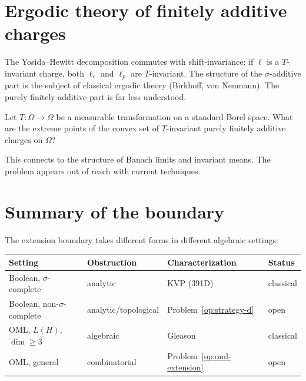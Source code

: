 \section{Ergodic theory of finitely additive charges}
\label{sec:ergodic}

The Yosida--Hewitt decomposition commutes with shift-invariance:
if $\ell$ is a $T$-invariant charge, both $\ell_c$ and $\ell_p$ are
$T$-invariant.  The structure of the $\sigma$-additive part is the
subject of classical ergodic theory (Birkhoff, von Neumann).  The
purely finitely additive part is far less understood.

\begin{openproblem}
\label{op:ergodic-pfa}
Let $T \colon \Omega \to \Omega$ be a measurable transformation on a
standard Borel space.  What are the extreme points of the convex set
of $T$-invariant purely finitely additive charges on $\Omega$?
\end{openproblem}

This connects to the structure of Banach limits and invariant means.
The problem appears out of reach with current techniques.

\section{Summary of the boundary}
\label{sec:summary}

The extension boundary takes different forms in different algebraic
settings:

\begin{center}
\begin{tabular}{@{}llll@{}}
\toprule
\textbf{Setting} & \textbf{Obstruction} &
  \textbf{Characterization} & \textbf{Status} \\
\midrule
Boolean, $\sigma$-complete & analytic &
  KVP (391D) & classical \\
Boolean, non-$\sigma$-complete & analytic/topological &
  Problem~\ref{op:strategy-d} & open \\
OML, $L(H)$, $\dim \geq 3$ & algebraic &
  Gleason & classical \\
OML, general & combinatorial &
  Problem~\ref{op:oml-extension} & open \\
\bottomrule
\end{tabular}
\end{center}

